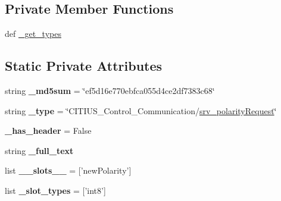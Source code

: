 \subsection*{\-Private \-Member \-Functions}
\begin{DoxyCompactItemize}
\item 
def \hyperlink{class_c_i_t_i_u_s___control___communication_1_1srv_1_1__srv__polarity_1_1srv__polarity_request_aa5ed1140c1ba37587e1b369a73a49e2b}{\-\_\-get\-\_\-types}
\end{DoxyCompactItemize}
\subsection*{\-Static \-Private \-Attributes}
\begin{DoxyCompactItemize}
\item 
\hypertarget{class_c_i_t_i_u_s___control___communication_1_1srv_1_1__srv__polarity_1_1srv__polarity_request_a658714ae413824b1f08f782caea8a179}{string {\bfseries \-\_\-md5sum} = \char`\"{}ef5d16e770ebfca055d4ce2df7383c68\char`\"{}}\label{class_c_i_t_i_u_s___control___communication_1_1srv_1_1__srv__polarity_1_1srv__polarity_request_a658714ae413824b1f08f782caea8a179}

\item 
\hypertarget{class_c_i_t_i_u_s___control___communication_1_1srv_1_1__srv__polarity_1_1srv__polarity_request_ae8de36b9f53d17cdcc844b9f0cbdb4ec}{string {\bfseries \-\_\-type} = \char`\"{}\-C\-I\-T\-I\-U\-S\-\_\-\-Control\-\_\-\-Communication/\hyperlink{class_c_i_t_i_u_s___control___communication_1_1srv_1_1__srv__polarity_1_1srv__polarity_request}{srv\-\_\-polarity\-Request}\char`\"{}}\label{class_c_i_t_i_u_s___control___communication_1_1srv_1_1__srv__polarity_1_1srv__polarity_request_ae8de36b9f53d17cdcc844b9f0cbdb4ec}

\item 
\hypertarget{class_c_i_t_i_u_s___control___communication_1_1srv_1_1__srv__polarity_1_1srv__polarity_request_a9dcd12d2f825a73e0311490adc4aebdd}{{\bfseries \-\_\-has\-\_\-header} = \-False}\label{class_c_i_t_i_u_s___control___communication_1_1srv_1_1__srv__polarity_1_1srv__polarity_request_a9dcd12d2f825a73e0311490adc4aebdd}

\item 
string {\bfseries \-\_\-full\-\_\-text}
\item 
\hypertarget{class_c_i_t_i_u_s___control___communication_1_1srv_1_1__srv__polarity_1_1srv__polarity_request_ac5a1d24ec27734274ec60371ef70e217}{list {\bfseries \-\_\-\-\_\-slots\-\_\-\-\_\-} = \mbox{[}'new\-Polarity'\mbox{]}}\label{class_c_i_t_i_u_s___control___communication_1_1srv_1_1__srv__polarity_1_1srv__polarity_request_ac5a1d24ec27734274ec60371ef70e217}

\item 
\hypertarget{class_c_i_t_i_u_s___control___communication_1_1srv_1_1__srv__polarity_1_1srv__polarity_request_ac74185ce6faa4ead29d773beadab120e}{list {\bfseries \-\_\-slot\-\_\-types} = \mbox{[}'int8'\mbox{]}}\label{class_c_i_t_i_u_s___control___communication_1_1srv_1_1__srv__polarity_1_1srv__polarity_request_ac74185ce6faa4ead29d773beadab120e}

\end{DoxyCompactItemize}


